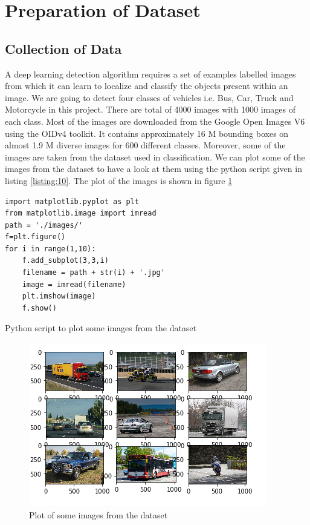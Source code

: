   \section{Preparation of Dataset}
  \subsection{Collection of Data}
  A deep learning  detection algorithm requires a set of examples labelled images from which it can learn to localize and classify the objects present within an image. We are going to detect four classes of vehicles i.e. Bus, Car, Truck and Motorcycle in this project. There are total of 4000 images with 1000 images of each class. Most of the images are downloaded from the Google Open Images V6 using the OIDv4 toolkit. It contains approximately 16 M bounding boxes on almost 1.9 M diverse images for 600 different classes. Moreover, some of the images are taken from the dataset used in classification. We can plot some of the images from the dataset to have a look at them using the python script given in listing \ref{listing:10}. The plot of the images is shown in figure \ref{fig:5.6}
\linespread{1.0}
\begin{longlisting}
\begin{verbatim}
import matplotlib.pyplot as plt
from matplotlib.image import imread
path = './images/'
f=plt.figure()
for i in range(1,10):
    f.add_subplot(3,3,i)
    filename = path + str(i) + '.jpg'
    image = imread(filename)
    plt.imshow(image)   
    f.show()
\end{verbatim}
\caption{Python script to plot some images from the dataset}
\label{listing:10}
\end{longlisting}
\begin{figure}[H]
\centering
\captionsetup{justification = centering}
\includegraphics[scale= 1]{CHAPTERS/Chapter-5/images/5.6.PNG}
 \caption{Plot of some images from the dataset } 
 \label{fig:5.6}
 \end{figure}
